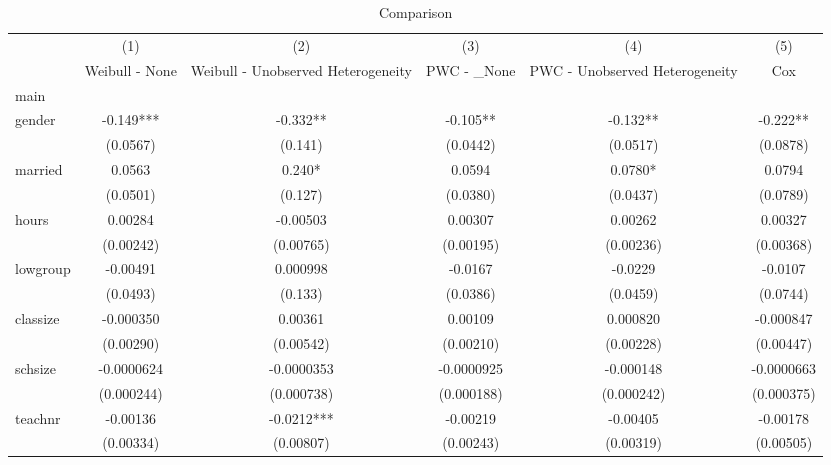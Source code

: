 \begin{table}[htbp]\centering
\def\sym#1{\ifmmode^{#1}\else\(^{#1}\)\fi}
\caption{Comparison}
\begin{tabular}{l*{5}{c}}
\hline\hline
            &\multicolumn{1}{c}{(1)}&\multicolumn{1}{c}{(2)}&\multicolumn{1}{c}{(3)}&\multicolumn{1}{c}{(4)}&\multicolumn{1}{c}{(5)}\\
            &\multicolumn{1}{c}{Weibull - None}&\multicolumn{1}{c}{Weibull - Unobserved Heterogeneity}&\multicolumn{1}{c}{PWC - \_None}&\multicolumn{1}{c}{PWC - Unobserved Heterogeneity}&\multicolumn{1}{c}{Cox}\\
\hline
main        &               &               &               &               &               \\
gender      &      -0.149***&      -0.332** &      -0.105** &      -0.132** &      -0.222** \\
            &    (0.0567)   &     (0.141)   &    (0.0442)   &    (0.0517)   &    (0.0878)   \\
[1em]
married     &      0.0563   &       0.240*  &      0.0594   &      0.0780*  &      0.0794   \\
            &    (0.0501)   &     (0.127)   &    (0.0380)   &    (0.0437)   &    (0.0789)   \\
[1em]
hours       &     0.00284   &    -0.00503   &     0.00307   &     0.00262   &     0.00327   \\
            &   (0.00242)   &   (0.00765)   &   (0.00195)   &   (0.00236)   &   (0.00368)   \\
[1em]
lowgroup    &    -0.00491   &    0.000998   &     -0.0167   &     -0.0229   &     -0.0107   \\
            &    (0.0493)   &     (0.133)   &    (0.0386)   &    (0.0459)   &    (0.0744)   \\
[1em]
classize    &   -0.000350   &     0.00361   &     0.00109   &    0.000820   &   -0.000847   \\
            &   (0.00290)   &   (0.00542)   &   (0.00210)   &   (0.00228)   &   (0.00447)   \\
[1em]
schsize     &  -0.0000624   &  -0.0000353   &  -0.0000925   &   -0.000148   &  -0.0000663   \\
            &  (0.000244)   &  (0.000738)   &  (0.000188)   &  (0.000242)   &  (0.000375)   \\
[1em]
teachnr     &    -0.00136   &     -0.0212***&    -0.00219   &    -0.00405   &    -0.00178   \\
            &   (0.00334)   &   (0.00807)   &   (0.00243)   &   (0.00319)   &   (0.00505)   \\

\end{tabular}
\end{table}
